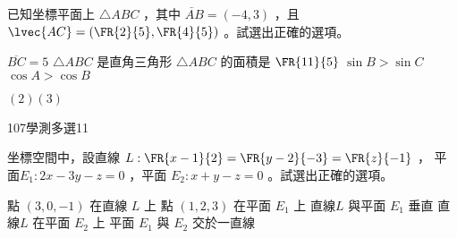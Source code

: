 \begin{QUESTIONS}
\begin{QUESTION}
\begin{ExamAnsRateInfo}{}{}{}{}
        \end{ExamAnsRateInfo}
        \begin{QBODY}
            已知坐標平面上 $\triangle ABC$ ，其中 $\lvec{AB} = (-4,3)$ ，且 $\lvec{AC} = \left(\FR{2}{5}, \FR{4}{5} \right)$ 。試選出正確的選項。
            \begin{QOPS}
                \QOP $\overline{BC}=5$ 
                \QOP $\triangle ABC$ 是直角三角形
                \QOP $\triangle ABC$ 的面積是 $\FR{11}{5}$
                \QOP $\sin B > \sin C$
                \QOP $\cos A > \cos B$
            \end{QOPS}
        \end{QBODY}
        \begin{QFROMS}
        \end{QFROMS}
        \begin{QTAGS}\end{QTAGS}
        \begin{QANS}
            $(2)(3)$
        \end{QANS}
        \begin{QSOLLIST}
        \end{QSOLLIST}
        \begin{QEMPTYSPACE}
        \end{QEMPTYSPACE}
    \end{QUESTION}
    \begin{QUESTION}
        \begin{ExamInfo}{107}{學測}{多選}{11}
        \end{ExamInfo}
        \begin{ExamAnsRateInfo}{}{}{}{}
        \end{ExamAnsRateInfo}
        \begin{QBODY}
            坐標空間中，設直線 $L: \FR{x-1}{2}=\FR{y-2}{-3} =\FR{z}{-1} $ ， 平面$E_1:2x-3y-z=0$ ，平面 $E_2:x+y-z=0$
            。試選出正確的選項。
            \begin{QOPS}
                \QOP 點 $(3,0,-1)$ 在直線 $L$ 上
                \QOP 點 $(1,2,3)$ 在平面 $E_1$ 上
                \QOP 直線$L$ 與平面 $E_1$ 垂直
                \QOP 直線$L$ 在平面 $E_2$ 上
                \QOP 平面 $E_1$ 與 $E_2$ 交於一直線
            \end{QOPS}
        \end{QBODY}
        \begin{QFROMS}
        \end{QFROMS}
        \begin{QTAGS}\end{QTAGS}

\end{QUESTION}
\end{QUESTIONS}
